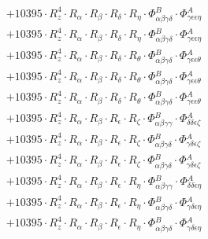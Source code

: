 \documentclass{article}
\begin{document}
\begin{subequations}
\begin{gather}
\begin{array}{c}
 \\[0.2em] 		 + 10395 \cdot R_{z}^{4} \cdot R_{\alpha{}} \cdot R_{\beta{}} \cdot R_{\delta{}} \cdot R_{\eta{}} \cdot \Phi{}^{B}_{\alpha{}\beta{}\gamma{}\delta{}} \cdot \Phi{}^{A}_{\gamma{}\epsilon{}\epsilon{}\eta{}} 
 \\[0.2em] 		 + 10395 \cdot R_{z}^{4} \cdot R_{\alpha{}} \cdot R_{\beta{}} \cdot R_{\delta{}} \cdot R_{\eta{}} \cdot \Phi{}^{B}_{\alpha{}\beta{}\gamma{}\delta{}} \cdot \Phi{}^{A}_{\gamma{}\epsilon{}\epsilon{}\eta{}} 
 \\[0.2em] 		 + 10395 \cdot R_{z}^{4} \cdot R_{\alpha{}} \cdot R_{\beta{}} \cdot R_{\delta{}} \cdot R_{\theta{}} \cdot \Phi{}^{B}_{\alpha{}\beta{}\gamma{}\delta{}} \cdot \Phi{}^{A}_{\gamma{}\epsilon{}\epsilon{}\theta{}} 
 \\[0.2em] 		 + 10395 \cdot R_{z}^{4} \cdot R_{\alpha{}} \cdot R_{\beta{}} \cdot R_{\delta{}} \cdot R_{\theta{}} \cdot \Phi{}^{B}_{\alpha{}\beta{}\gamma{}\delta{}} \cdot \Phi{}^{A}_{\gamma{}\epsilon{}\epsilon{}\theta{}} 
 \\[0.2em] 		 + 10395 \cdot R_{z}^{4} \cdot R_{\alpha{}} \cdot R_{\beta{}} \cdot R_{\delta{}} \cdot R_{\theta{}} \cdot \Phi{}^{B}_{\alpha{}\beta{}\gamma{}\delta{}} \cdot \Phi{}^{A}_{\gamma{}\epsilon{}\epsilon{}\theta{}} 
 \\[0.2em] 		 + 10395 \cdot R_{z}^{4} \cdot R_{\alpha{}} \cdot R_{\beta{}} \cdot R_{\epsilon{}} \cdot R_{\zeta{}} \cdot \Phi{}^{B}_{\alpha{}\beta{}\gamma{}\gamma{}} \cdot \Phi{}^{A}_{\delta{}\delta{}\epsilon{}\zeta{}} 
 \\[0.2em] 		 + 10395 \cdot R_{z}^{4} \cdot R_{\alpha{}} \cdot R_{\beta{}} \cdot R_{\epsilon{}} \cdot R_{\zeta{}} \cdot \Phi{}^{B}_{\alpha{}\beta{}\gamma{}\delta{}} \cdot \Phi{}^{A}_{\gamma{}\delta{}\epsilon{}\zeta{}} 
 \\[0.2em] 		 + 10395 \cdot R_{z}^{4} \cdot R_{\alpha{}} \cdot R_{\beta{}} \cdot R_{\epsilon{}} \cdot R_{\zeta{}} \cdot \Phi{}^{B}_{\alpha{}\beta{}\gamma{}\delta{}} \cdot \Phi{}^{A}_{\gamma{}\delta{}\epsilon{}\zeta{}} 
 \\[0.2em] 		 + 10395 \cdot R_{z}^{4} \cdot R_{\alpha{}} \cdot R_{\beta{}} \cdot R_{\epsilon{}} \cdot R_{\eta{}} \cdot \Phi{}^{B}_{\alpha{}\beta{}\gamma{}\gamma{}} \cdot \Phi{}^{A}_{\delta{}\delta{}\epsilon{}\eta{}} 
 \\[0.2em] 		 + 10395 \cdot R_{z}^{4} \cdot R_{\alpha{}} \cdot R_{\beta{}} \cdot R_{\epsilon{}} \cdot R_{\eta{}} \cdot \Phi{}^{B}_{\alpha{}\beta{}\gamma{}\delta{}} \cdot \Phi{}^{A}_{\gamma{}\delta{}\epsilon{}\eta{}} 
 \\[0.2em] 		 + 10395 \cdot R_{z}^{4} \cdot R_{\alpha{}} \cdot R_{\beta{}} \cdot R_{\epsilon{}} \cdot R_{\eta{}} \cdot \Phi{}^{B}_{\alpha{}\beta{}\gamma{}\delta{}} \cdot \Phi{}^{A}_{\gamma{}\delta{}\epsilon{}\eta{}} 

\end{array}
\end{gather}
\end{subequations}
\end{document}
